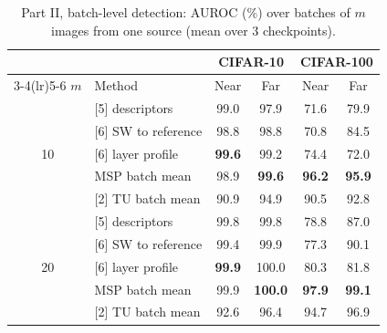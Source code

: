 \begin{table}[t]
\centering
\setlength{\tabcolsep}{4pt}\small
\begin{tabular}{@{}clcccc@{}}
\toprule
 & & \multicolumn{2}{c}{CIFAR-10} & \multicolumn{2}{c}{CIFAR-100} \\
\cmidrule(lr){3-4}\cmidrule(lr){5-6}
$m$ & Method & Near & Far & Near & Far \\
\midrule
\multirow{5}{*}{10} & {[5] descriptors} & 99.0 & 97.9 & 71.6 & 79.9 \\
 & {[6] SW to reference} & 98.8 & 98.8 & 70.8 & 84.5 \\
 & {[6] layer profile} & \textbf{99.6} & 99.2 & 74.4 & 72.0 \\
 & {MSP batch mean} & 98.9 & \textbf{99.6} & \textbf{96.2} & \textbf{95.9} \\
 & {[2] TU batch mean} & 90.9 & 94.9 & 90.5 & 92.8 \\
\midrule
\multirow{5}{*}{20} & {[5] descriptors} & 99.8 & 99.8 & 78.8 & 87.0 \\
 & {[6] SW to reference} & 99.4 & 99.9 & 77.3 & 90.1 \\
 & {[6] layer profile} & \textbf{99.9} & 100.0 & 80.3 & 81.8 \\
 & {MSP batch mean} & 99.9 & \textbf{100.0} & \textbf{97.9} & \textbf{99.1} \\
 & {[2] TU batch mean} & 92.6 & 96.4 & 94.7 & 96.9 \\
\bottomrule
\end{tabular}
\caption{Part II, batch-level detection: AUROC (\%) over batches of $m$ images from one source (mean over 3 checkpoints).}
\label{tab:p2-batch}
\end{table}
